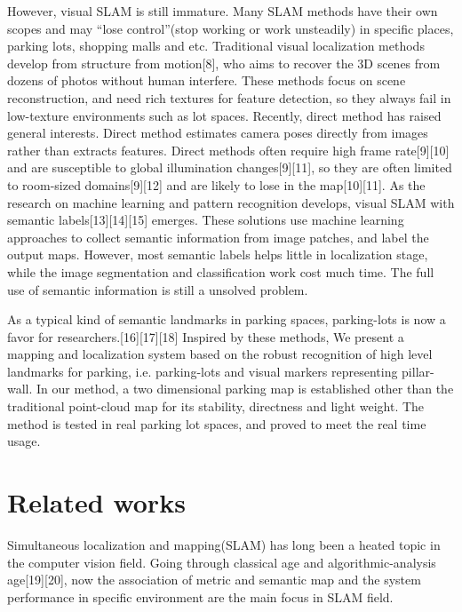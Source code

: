 \documentclass[journal]{IEEEtran}
\begin{document}
However, visual SLAM is still immature. Many SLAM methods have their own scopes and may “lose control”(stop working or work unsteadily) in specific places, parking lots, shopping malls and etc. Traditional visual localization methods\cite{Klein2007Parallel}\cite{Mur2017ORB} develop from structure from motion[8], who aims to recover the 3D scenes from dozens of photos without human interfere. These methods focus on scene reconstruction, and need rich textures for feature detection, so they always fail in low-texture environments such as lot spaces. Recently, direct method has raised general interests. Direct method estimates camera poses directly from images rather than extracts features. Direct methods often require high frame rate[9][10] and are susceptible to global illumination changes[9][11], so they are often limited to room-sized domains[9][12] and are likely to lose in the map[10][11]. As the research on machine learning and pattern recognition develops, visual SLAM with semantic labels[13][14][15] emerges. These solutions use machine learning approaches to collect semantic information from image patches, and label the output maps. However, most semantic labels helps little in localization stage, while the image segmentation and classification work cost much time. The full use of semantic information is still a unsolved problem.
	
As a typical kind of semantic landmarks in parking spaces, parking-lots is now a favor for researchers.[16][17][18] Inspired by these methods, We present a mapping and localization system based on the robust recognition of high level landmarks for parking, i.e. parking-lots and visual markers representing pillar-wall. In our method, a two dimensional parking map is established other than the traditional point-cloud map for its stability, directness and light weight. The method is tested in real parking lot spaces, and proved to meet the real time usage.

\section{Related works}
Simultaneous localization and mapping(SLAM) has long been a heated topic in the computer vision field. Going through classical age and algorithmic-analysis age[19][20], now the  association of metric and semantic map and the system performance in specific environment are the main focus in SLAM field. 
	
\end{document}

